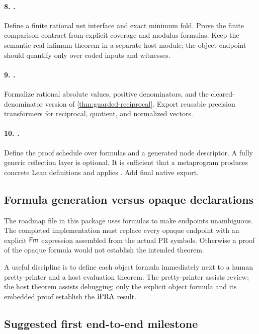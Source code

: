 \paragraph{8. .}
Define a finite rational net interface and exact minimum fold.  Prove the finite
comparison contract from explicit coverage and modulus formulas.  Keep the semantic
real infimum theorem in a separate host module; the object endpoint should quantify
only over coded inputs and witnesses.

\paragraph{9. .}
Formalize rational absolute values, positive denominators, and the cleared-denominator
version of \cref{thm:guarded-reciprocal}.  Export reusable precision transformers for
reciprocal, quotient, and normalized vectors.

\paragraph{10. .}
Define the proof schedule over formulas and a generated node descriptor.  A fully
generic reflection layer is optional.  It is sufficient that a metaprogram produces
concrete Lean definitions and applies .  Add final native export.

\subsection{Formula generation versus opaque declarations}

The roadmap file in this package uses  formulas to make endpoints
unambiguous.  The completed implementation must replace every opaque endpoint with an
explicit \(\mathsf{Fm}\) expression assembled from the actual PR symbols.  Otherwise a proof
of the opaque formula would not establish the intended theorem.

A useful discipline is to define each object formula immediately next to a human
pretty-printer and a host evaluation theorem.  The pretty-printer assists review; the
host theorem assists debugging; only the explicit object formula and its embedded
proof establish the \(\mathrm{iPRA}\) result.

\subsection{Suggested first end-to-end milestone}

